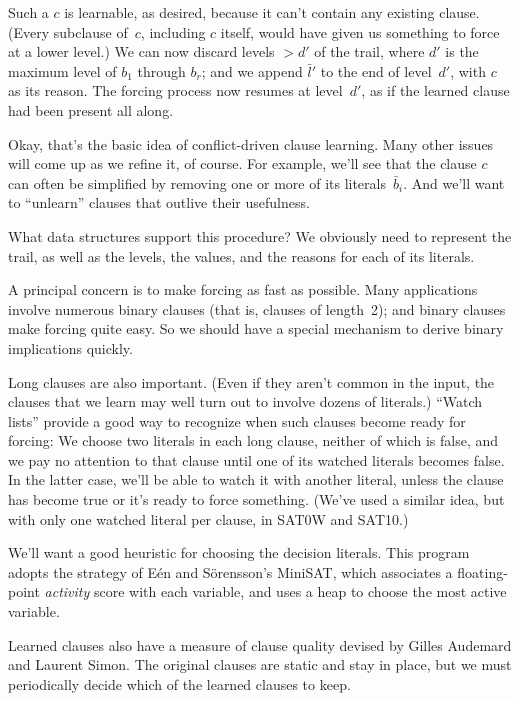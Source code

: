 Such a $c$ is learnable, as desired, because it can't contain any
existing clause. (Every subclause of~$c$, including $c$ itself,
would have given us something to
force at a lower level.) We can now discard levels $>d'$ of the trail, where
$d'$ is the maximum level of $b_1$ through $b_r$; and we append
$\bar l'$ to the end of level~$d'$, with $c$ as its reason.
The forcing process now resumes at level~$d'$, as if the learned
clause had been present all along.

Okay, that's the basic idea of conflict-driven clause learning.
Many other issues will come up as we refine it, of course. For example,
we'll see that the clause $c$ can often be simplified by removing
one or more of its literals~$\bar b_i$. And we'll want to ``unlearn'' clauses
that outlive their usefulness.

\fi

What data structures support this procedure? We obviously need to
represent the trail, as well as the levels, the values, and the reasons for
each of its literals.

A principal concern is to make forcing as fast as possible. Many
applications involve numerous binary clauses (that is, clauses of length~2);
and binary clauses make forcing quite easy. So we should have a
special mechanism to derive binary implications quickly.

Long clauses are also important. (Even if they aren't common in the input,
the clauses that we learn may well turn out to involve dozens of literals.)
``Watch lists'' provide a good way to recognize when such clauses
become ready for forcing: We choose two literals in each long clause,
neither of which is false, and we pay no attention to that clause until one of
its watched literals becomes false. In the latter case, we'll be able to
watch it with another literal, unless the clause has become true or it's ready
to force something. (We've used a similar idea, but with only one watched
literal per clause, in {\mc SAT0W} and {\mc SAT10}.)

We'll want a good heuristic for choosing the decision literals.
This program adopts the strategy of E\'en and S\"orensson's
MiniSAT, which associates a floating-point {\it activity\/}
score with each variable, and uses a heap to choose the most
active variable.

Learned clauses also have a measure of clause quality devised by Gilles
Audemard
and Laurent Simon. The original clauses are static and stay in place,
but we must periodically decide which of the learned clauses to keep.

